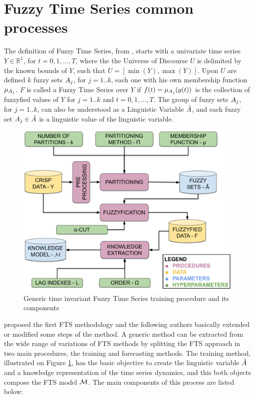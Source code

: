 \section{Fuzzy Time Series common processes}
\label{sec:common_fts} 


The definition of Fuzzy Time Series, from \cite{song1993fuzzy}, starts with a univariate time series $Y \in \mathbb{R}^1$, for $t = 0,1,...,T$, where the the Universe of Discourse $U$ is delimited by the known bounds of $Y$, such that $U = [\min(Y),\max(Y)]$. Upon $U$ are defined $k$ fuzzy sets $A_j$, for $j = 1..k$, each one with his own membership function $\mu_{A_j}$. $F$ is called a Fuzzy Time Series over $Y$ if $f(t) = \mu_{A_j}(y(t))$ is the collection of fuzzyfied values of $Y$ for $j = 1..k$ and $t = 0,1,...,T$. The group of fuzzy sets $A_j$, for $j = 1..k$, can also be understood as a Linguistic Variable $\tilde{A}$, and each fuzzy set $A_j \in \tilde{A}$ is a linguistic value of the linguistic variable. 

\begin{figure}
    \centering
    \includegraphics[width=\textwidth]{figures/fts_training.pdf}
    \caption{Generic time invariant Fuzzy Time Series training procedure and its components}
    \label{fig:fts_training}
\end{figure}

\cite{Song1993partI} proposed the first FTS methodology and the following authors basically extended or modified some steps of the method. A generic method can be extracted from the wide range of variations of FTS methods by splitting the FTS approach in two main procedures, the training and forecasting methods. The training method, illustrated on Figure \ref{fig:fts_training}, has the basic objective to create the linguistic variable $\tilde{A}$ and a knowledge representation of the time series dynamics, and this both objects compose the FTS model $\mathcal{M}$. The main components of this process are listed below:

